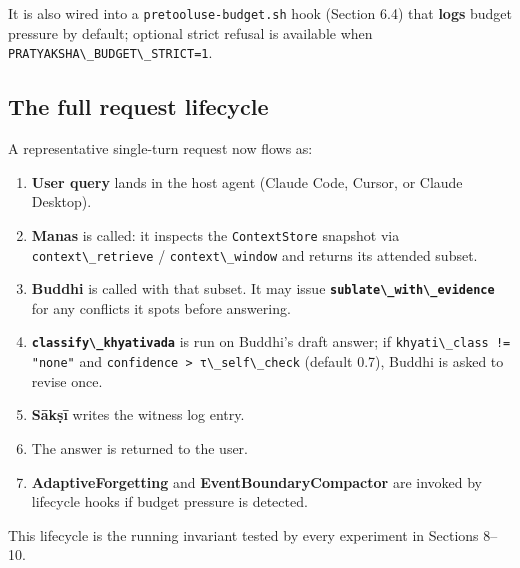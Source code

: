 It is also wired into a \passthrough{\lstinline!pretooluse-budget.sh!} hook (Section 6.4) that \textbf{logs} budget pressure by default; optional strict refusal is available when \passthrough{\lstinline!PRATYAKSHA\_BUDGET\_STRICT=1!}.

\subsection{The full request lifecycle}\label{the-full-request-lifecycle}

A representative single-turn request now flows as:

\begin{enumerate}
\def\labelenumi{\arabic{enumi}.}
\tightlist
\item
  \textbf{User query} lands in the host agent (Claude Code, Cursor, or Claude Desktop).
\item
  \textbf{Manas} is called: it inspects the \passthrough{\lstinline!ContextStore!} snapshot via \passthrough{\lstinline!context\_retrieve!} / \passthrough{\lstinline!context\_window!} and returns its attended subset.
\item
  \textbf{Buddhi} is called with that subset. It may issue \textbf{\passthrough{\lstinline!sublate\_with\_evidence!}} for any conflicts it spots before answering.
\item
  \textbf{\passthrough{\lstinline!classify\_khyativada!}} is run on Buddhi's draft answer; if \passthrough{\lstinline'khyati\_class != "none"'} and \passthrough{\lstinline!confidence > τ\_self\_check!} (default 0.7), Buddhi is asked to revise once.
\item
  \textbf{Sākṣī} writes the witness log entry.
\item
  The answer is returned to the user.
\item
  \textbf{AdaptiveForgetting} and \textbf{EventBoundaryCompactor} are invoked by lifecycle hooks if budget pressure is detected.
\end{enumerate}

This lifecycle is the running invariant tested by every experiment in Sections 8--10.
